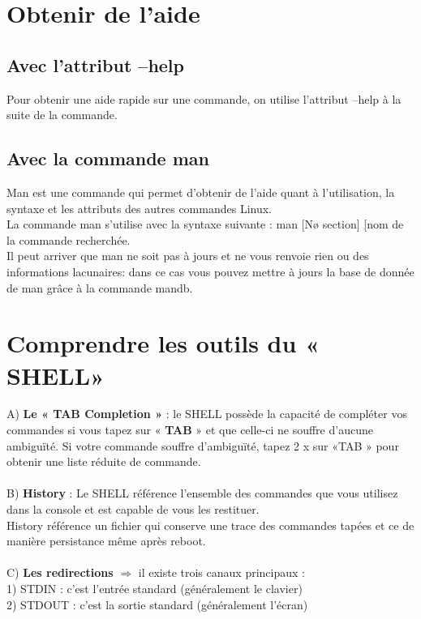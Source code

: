 \documentclass[a4paper, 11pt, french, oneside]{book}
\begin{document}
  \section{\Large Obtenir de l’aide }
	\subsection{Avec l’attribut --help}
	 Pour obtenir une aide rapide sur une commande, on utilise l’attribut --help à la suite de la commande.
	\subsection{Avec la commande man} 
     {\color{red}Man} est une commande qui permet d’obtenir de l’aide quant à l’utilisation,
     la syntaxe et les attributs des autres commandes Linux.\\
     La commande man s’utilise avec la syntaxe suivante : man [Nø section] [nom de la commande recherchée.\\
     Il peut arriver que man ne soit pas à jours et ne vous renvoie rien ou des informations lacunaires: dans ce cas vous pouvez mettre à jours la base de donnée de man grâce à la commande mandb.
  \section{\Large  Comprendre les outils du « SHELL»}
   A) \textbf{Le « TAB Completion »} : le SHELL possède la capacité de compléter vos commandes si vous tapez sur « \textbf{TAB} » et que celle-ci ne souffre d’aucune ambiguïté. Si votre commande souffre d’ambiguïté, tapez 2 x sur «TAB » pour obtenir une liste réduite de commande.\\\\
   B) \textbf{History} : Le SHELL référence l’ensemble des commandes que vous utilisez dans la console et est capable de vous les restituer.\\
    History référence un fichier qui conserve une trace des commandes tapées et ce de manière persistance même après reboot.\\\\
   C) \textbf{Les redirections} $\Rightarrow$ il existe trois canaux principaux : \\
   
	1) {\color{red}STDIN} : c’est l’entrée standard (généralement le clavier)\\
	
	2) {\color{red}STDOUT} : c’est la sortie standard (généralement l’écran)\\
	
\end{document}

